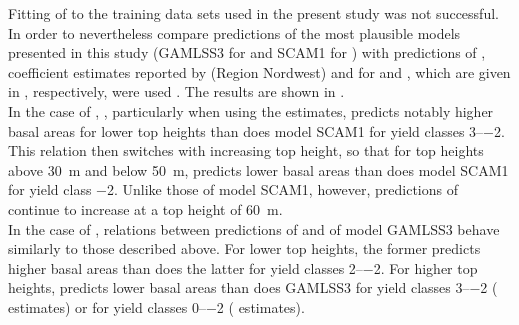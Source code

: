 Fitting of  to the training data sets used in the present study was not successful.  In order to nevertheless compare predictions of the most plausible models presented in this study (GAMLSS3 for \Beech{} and SCAM1 for \Spruce{}) with predictions of , coefficient estimates reported by \textcite{Doebbeler2004} (Region Nordwest) and \textcite{Woerdehoff2016} for \Beech{} and \Spruce{}, which are given in , respectively, were used .  The results are shown in .  \\
In the case of \Beech{}, , particularly when using the \textcite{Doebbeler2004} estimates, predicts notably higher basal areas for lower top heights than does model SCAM1 for yield classes \numrange{3}{-2}.  This relation then switches with increasing top height, so that for top heights above \SI{30}{\meter} and below \SI{50}{\meter},  predicts lower basal areas than does model SCAM1 for yield class \num{-2}.  Unlike those of model SCAM1, however, predictions of  continue to increase at a top height of \SI{60}{\meter}.  \\
In the case of \Spruce{}, relations between predictions of  and of model GAMLSS3 behave similarly to those described above.  For lower top heights, the former predicts higher basal areas than does the latter for yield classes \numrange{2}{-2}.  For higher top heights,  predicts lower basal areas than does GAMLSS3 for yield classes \numrange{3}{-2} (\textcite{Woerdehoff2016} estimates) or for yield classes \numrange{0}{-2} (\textcite{Doebbeler2004} estimates).  \\
